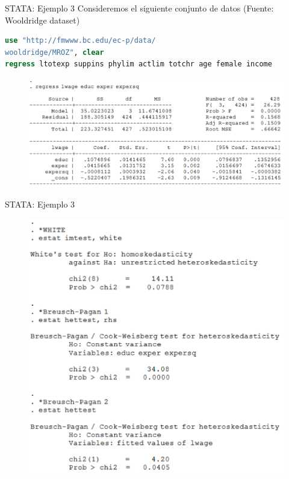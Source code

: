 \begin{frame}[fragile]{STATA: Ejemplo 3}
	Consideremos el siguiente conjunto de datos (Fuente: Wooldridge dataset)
{\small
\begin{lstlisting}[language=Stata, numbers=none]
use "http://fmwww.bc.edu/ec-p/data/
wooldridge/MROZ", clear
regress ltotexp suppins phylim actlim totchr age female income
\end{lstlisting}
}
	\begin{figure}
		\centering
		\includegraphics[scale=.35]{fig/stata3a.png}
	\end{figure}
\end{frame}
\begin{frame}{STATA: Ejemplo 3}
	\begin{figure}
		\centering
		\includegraphics[scale=.36]{fig/stata3b.png}
	\end{figure}
\end{frame}
